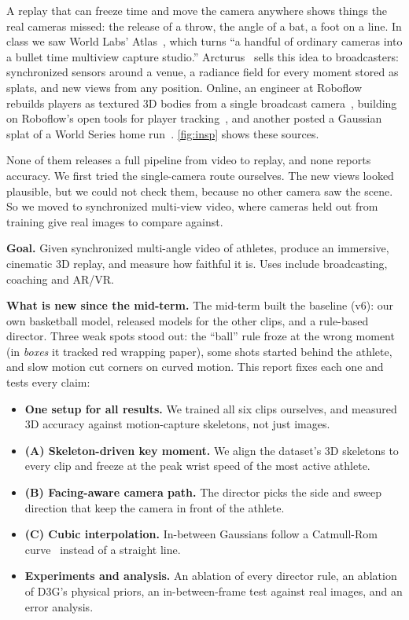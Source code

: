 \documentclass[10pt,twocolumn,letterpaper]{article}
\begin{document}
A replay that can freeze time and move the camera anywhere shows things the real cameras missed: the release of a throw, the angle of a bat, a foot on a line. In class we saw World Labs' Atlas~\cite{worldlabs2026atlas}, which turns ``a handful of ordinary cameras into a bullet time multiview capture studio.'' Arcturus~\cite{arcturus} sells this idea to broadcasters: synchronized sensors around a venue, a radiance field for every moment stored as splats, and new views from any position. Online, an engineer at Roboflow rebuilds players as textured 3D bodies from a single broadcast camera~\cite{mirrash2026b,mirrash2026}, building on Roboflow's open tools for player tracking~\cite{skalski2025roboflow}, and another posted a Gaussian splat of a World Series home run~\cite{middlecamp2026}. \cref{fig:insp} shows these sources.

None of them releases a full pipeline from video to replay, and none reports accuracy. We first tried the single-camera route ourselves. The new views looked plausible, but we could not check them, because no other camera saw the scene. So we moved to synchronized multi-view video, where cameras held out from training give real images to compare against.

\noindent\textbf{Goal.} Given synchronized multi-angle video of athletes, produce an immersive, cinematic 3D replay, and measure how faithful it is. Uses include broadcasting, coaching and AR/VR.

\noindent\textbf{What is new since the mid-term.} The mid-term built the baseline (v6): our own basketball model, released models for the other clips, and a rule-based director. Three weak spots stood out: the ``ball'' rule froze at the wrong moment (in \emph{boxes} it tracked red wrapping paper), some shots started behind the athlete, and slow motion cut corners on curved motion. This report fixes each one and tests every claim:
\begin{itemize}\itemsep0pt
\item \textbf{One setup for all results.} We trained all six clips ourselves, and measured 3D accuracy against motion-capture skeletons, not just images.
\item \textbf{(A) Skeleton-driven key moment.} We align the dataset's 3D skeletons to every clip and freeze at the peak wrist speed of the most active athlete.
\item \textbf{(B) Facing-aware camera path.} The director picks the side and sweep direction that keep the camera in front of the athlete.
\item \textbf{(C) Cubic interpolation.} In-between Gaussians follow a Catmull-Rom curve~\cite{catmull1974} instead of a straight line.
\item \textbf{Experiments and analysis.} An ablation of every director rule, an ablation of D3G's physical priors, an in-between-frame test against real images, and an error analysis.
\end{itemize}
\end{document}
